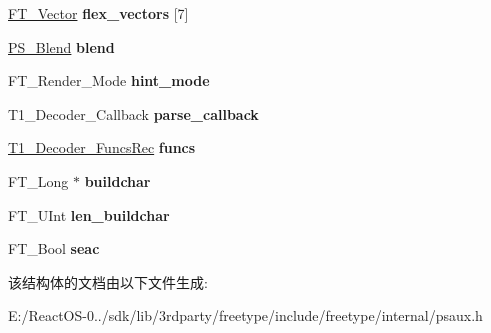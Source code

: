 \begin{DoxyCompactItemize}
\hyperlink{struct_f_t___vector__}{F\+T\+\_\+\+Vector} {\bfseries flex\+\_\+vectors} \mbox{[}7\mbox{]}
\item 
\mbox{\label{struct_t1___decoder_rec___a0cd698c7041cb4f319949b62f215f7c7}} 
\hyperlink{struct_p_s___blend_rec__}{P\+S\+\_\+\+Blend} {\bfseries blend}
\item 
\mbox{\label{struct_t1___decoder_rec___a364b15149edb573dcc79be015eba61b4}} 
F\+T\+\_\+\+Render\+\_\+\+Mode {\bfseries hint\+\_\+mode}
\item 
\mbox{\label{struct_t1___decoder_rec___a840af0b01e7adb1e3aa521a936196b62}} 
T1\+\_\+\+Decoder\+\_\+\+Callback {\bfseries parse\+\_\+callback}
\item 
\mbox{\label{struct_t1___decoder_rec___a6b0f5f7cb3f44e88880aa9c927d79775}} 
\hyperlink{struct_t1___decoder___funcs_rec__}{T1\+\_\+\+Decoder\+\_\+\+Funcs\+Rec} {\bfseries funcs}
\item 
\mbox{\label{struct_t1___decoder_rec___a967ee06cbbdc8823be8f95df5db625b9}} 
F\+T\+\_\+\+Long $\ast$ {\bfseries buildchar}
\item 
\mbox{\label{struct_t1___decoder_rec___a55fd1c88d6f7badaec2aa13db17c816f}} 
F\+T\+\_\+\+U\+Int {\bfseries len\+\_\+buildchar}
\item 
\mbox{\label{struct_t1___decoder_rec___a45bf18b54ff973177ea3061ef0b705c6}} 
F\+T\+\_\+\+Bool {\bfseries seac}
\end{DoxyCompactItemize}


该结构体的文档由以下文件生成\+:\begin{DoxyCompactItemize}
\item 
E\+:/\+React\+O\+S-\/0../sdk/lib/3rdparty/freetype/include/freetype/internal/psaux.\+h\end{DoxyCompactItemize}
